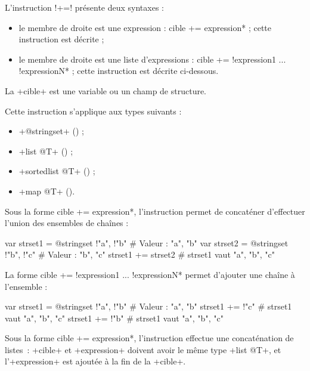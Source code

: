 L'instruction \ggs!+=! présente deux syntaxes :
\begin{itemize}
  \item le membre de droite est une expression : \ggs*cible += expression* ; cette instruction est décrite  ;
  \item le membre de droite est une liste d'expressions : \ggs*cible += !expression1 ... !expressionN* ; cette instruction est décrite ci-dessous.
\end{itemize}

La \ggs+cible+ est une variable ou un champ de structure.

Cette instruction s'applique aux types suivants :
\begin{itemize}
  \item \ggs+@stringset+ () ;
  \item \ggs+list @T+ () ;
  \item \ggs+sortedlist @T+ () ;
  \item \ggs+map @T+ ().
\end{itemize}



Sous la forme \ggs*cible += expression*, l'instruction permet de concaténer d'effectuer l'union des ensembles de chaînes :
\begin{galgas}
var strset1 = @stringset {!"a", !"b"} # Valeur : "a", "b"
var strset2 = @stringset {!"b", !"c"} # Valeur : "b", "c"
strset1 += strset2 # strset1 vaut "a", "b", "c"
\end{galgas}

La forme \ggs*cible += !expression1 ... !expressionN* permet d'ajouter une chaîne à l'ensemble :
\begin{galgas}
var strset1 = @stringset {!"a", !"b"} # Valeur : "a", "b"
strset1 += !"c" # strset1 vaut "a", "b", "c"
strset1 += !"b" # strset1 vaut "a", "b", "c"
\end{galgas}




Sous la forme \ggs*cible += expression*, l'instruction effectue une concaténation de listes~: \ggs+cible+ et \ggs+expression+ doivent avoir le même type \ggs+list @T+, et l'\ggs+expression+ est ajoutée à la fin de la \ggs+cible+.

